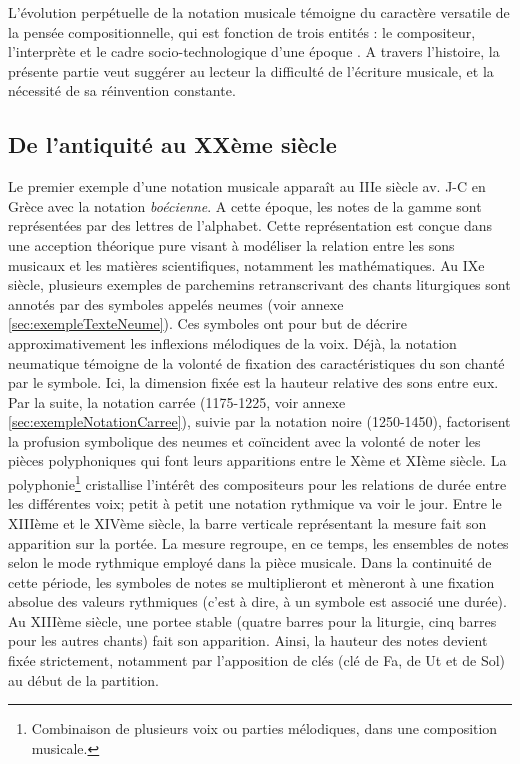 L'évolution perpétuelle de la notation musicale témoigne du caractère versatile de la pensée compositionnelle, qui est fonction de trois entités : le compositeur, l'interprète et le cadre socio-technologique d'une époque \cite{bosseur2005}.
A travers l'histoire, la présente partie veut suggérer au lecteur la difficulté de l'écriture musicale, et la nécessité de sa réinvention constante.

\subsection{De l'antiquité au XXème siècle}
\label{subsec:antiquiteAuXX}
Le premier exemple d'une notation musicale apparaît au IIIe siècle av. J-C en Grèce avec la notation \textit{boécienne}. A cette époque, les notes de la gamme sont représentées par des lettres de l'alphabet.
Cette représentation est conçue dans une acception théorique pure visant à modéliser la relation entre les sons musicaux et les matières scientifiques, notamment les mathématiques.
Au IXe siècle, plusieurs exemples de parchemins retranscrivant des chants liturgiques sont annotés par des symboles appelés \glspl{neume} (voir annexe \ref{sec:exempleTexteNeume}). 
Ces symboles ont pour but de décrire approximativement les inflexions mélodiques de la voix.
Déjà, la notation neumatique témoigne de la volonté de fixation des caractéristiques du son chanté par le symbole. Ici, la dimension fixée est la hauteur relative des sons entre eux.
Par la suite, la notation carrée (1175-1225, voir annexe \ref{sec:exempleNotationCarree}), suivie par la notation noire (1250-1450), factorisent la profusion symbolique des neumes et coïncident avec la volonté de noter les pièces polyphoniques qui font leurs apparitions entre le Xème et XIème siècle.
La \gls{polyphonie}\footnote{Combinaison de plusieurs voix ou parties mélodiques, dans une composition musicale.} cristallise l'intérêt des compositeurs pour les relations de durée entre les différentes voix; petit à petit une notation rythmique va voir le jour.
Entre le XIIIème et le XIVème siècle, la barre verticale représentant la mesure fait son apparition sur la portée. La mesure regroupe, en ce temps, les ensembles de notes selon le mode rythmique employé dans la pièce musicale.
Dans la continuité de cette période, les symboles de notes se multiplieront et mèneront à une fixation absolue des valeurs rythmiques (c'est à dire, à un symbole est associé une durée).
Au XIIIème siècle, une \gls{portee} stable (quatre barres pour la liturgie, cinq barres pour les autres chants) fait son apparition. Ainsi, la hauteur des notes devient fixée strictement, notamment par l'apposition de clés (clé de Fa, de Ut et de Sol) au début de la partition.
